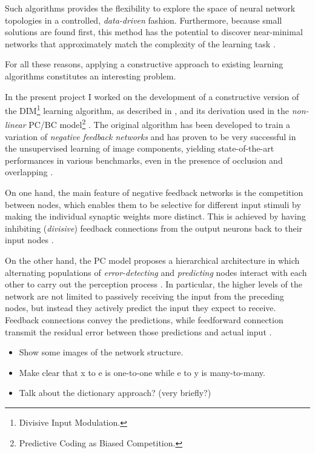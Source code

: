 \documentclass[11pt,a4paper]{report}
\begin{document}
			Such algorithms provides the flexibility to explore the space of neural network topologies in a controlled, \emph{data-driven} fashion. Furthermore, because small solutions are found first, this method has the potential to discover near-minimal networks that approximately match the complexity of the learning task \cite{parekh2000constructive}.
		
			For all these reasons, applying a constructive approach to existing learning algorithms constitutes an interesting problem.
		
			\newpage
		
			In the present project I worked on the development of a constructive version of the DIM\footnote{Divisive Input Modulation.} learning algorithm, as described in \cite{spratling2009unsupervised}, and its derivation \cite{spratling2012unsupervised} used in the \emph{non-linear} PC/BC model\footnote{Predictive Coding as Biased Competition.} \cite{spratling2008predictive}. The original algorithm has been developed to train a variation of \emph{negative feedback networks} and has proven to be very successful in the unsupervised learning of image components, yielding state-of-the-art performances in various benchmarks, even in the presence of occlusion and overlapping \cite{spratling2009unsupervised}.
		
			On one hand, the main feature of negative feedback networks is the competition between nodes, which enables them to be selective for different input stimuli by making the individual synaptic weights more distinct. This is achieved by having inhibiting (\emph{divisive}) feedback connections from the output neurons back to their input nodes \cite{spratling2009unsupervised}. 
		
			On the other hand, the PC model proposes a hierarchical architecture in which alternating populations of \emph{error-detecting} and \emph{predicting} nodes interact with each other to carry out the perception process \cite{spratling2014predictive}. In particular, the higher levels of the network are not limited to passively receiving the input from the preceding nodes, but instead they actively predict the input they expect to receive. Feedback connections convey the predictions, while feedforward connection transmit the residual error between those predictions and actual input \cite{spratling2008predictive}.

			\begin{itemize}
				\item Show some images of the network structure.
				\item Make clear that x to e is one-to-one while e to y is many-to-many.
				\item Talk about the dictionary approach? (very briefly?)
			\end{itemize}
\end{document}
